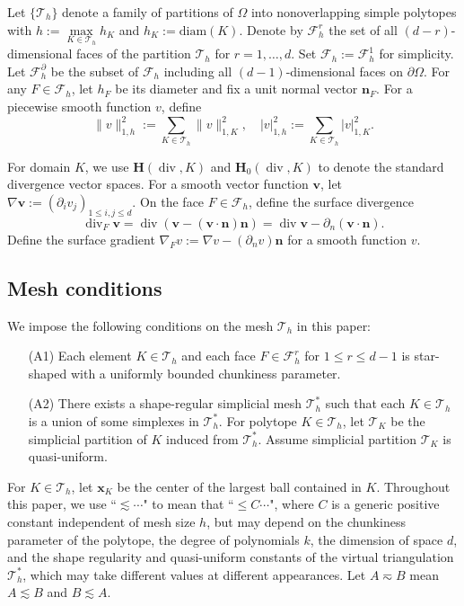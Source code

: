 \documentclass[10pt]{amsart}
\renewcommand{\div}{\operatorname{div}}
\numberwithin{equation}{section}
\begin{document}
Let $\{\mathcal {T}_h\}$ denote a family of partitions
of $\Omega$ into nonoverlapping simple polytopes with $h:=\max\limits_{K\in \mathcal {T}_h}h_K$
and $h_K:=\mbox{diam}(K)$.
Denote by $\mathcal F_h^r$ the set of all $(d-r)$-dimensional faces of the partition $\mathcal T_h$ for $r=1,\ldots,d$. Set $\mathcal F_h:=\mathcal F_h^1$ for simplicity. Let $\mathcal F_h^{\partial}$ be the subset of $\mathcal F_h$ including all $(d-1)$-dimensional faces on $\partial\Omega$. 
For any $F\in\mathcal{F}_h$,
let $h_F$ be its diameter and fix a unit normal vector $\boldsymbol{n}_F$.
For a piecewise smooth function $v$, define 
\[
\|v\|_{1,h}^2:=\sum_{K\in\mathcal T_h}\|v\|_{1,K}^2,\quad |v|_{1,h}^2:=\sum_{K\in\mathcal T_h}|v|_{1,K}^2.
\]

For domain $K$, we use $\boldsymbol{H}(\div, K)$ and $\boldsymbol{H}_0(\div, K)$ to denote the standard divergence vector spaces. 
For a smooth vector function $\boldsymbol{v}$, let $\nabla\boldsymbol{v}:=(\partial_iv_j)_{1\leq i,j\leq d}$.
On the face $F\in\mathcal F_h$, define the surface divergence
\[
\div_F\boldsymbol{v}=\div(\boldsymbol{v}-(\boldsymbol{v}\cdot\boldsymbol{n})\boldsymbol{n})=\div\boldsymbol{v}-\partial_n(\boldsymbol{v}\cdot\boldsymbol{n}).
\]
Define the surface gradient $\nabla_Fv:=\nabla v-(\partial_nv)\boldsymbol{n}$ for a smooth function $v$.



\subsection{Mesh conditions}\label{sec:meshcondition}
We impose the following conditions on the mesh $\mathcal T_h$ in this paper:
\begin{itemize}
 \item[(A1)] Each element $K\in \mathcal T_h$ and each face $F\in \mathcal F_h^r$ for $1\leq r\leq d-1$ is star-shaped with a uniformly bounded chunkiness parameter.

 \item[(A2)] There exists a shape-regular simplicial mesh $\mathcal T_h^*$ such that each $K\in \mathcal T_h$ is a union of some simplexes in $\mathcal T_h^*$. For polytope $K\in \mathcal T_h$, let $\mathcal T_K$ be the simplicial partition of $K$ induced from $\mathcal T_h^*$. Assume simplicial partition $\mathcal T_K$ is quasi-uniform.
\end{itemize}

For $K\in \mathcal T_h$, let $\boldsymbol{x}_K$ be the center of  the largest ball contained in $K$.
Throughout this paper, we use
``$\lesssim\cdots $" to mean that ``$\leq C\cdots$", where
$C$ is a generic positive constant independent of mesh size $h$, but may depend on the chunkiness parameter of the polytope, the degree of polynomials $k$, the dimension of space $d$, and the shape regularity and quasi-uniform constants of the virtual triangulation $\mathcal T^*_h$,
which may take different values at different appearances. Let $A\eqsim B$ mean $A\lesssim B$ and $B\lesssim A$.
\end{document}
